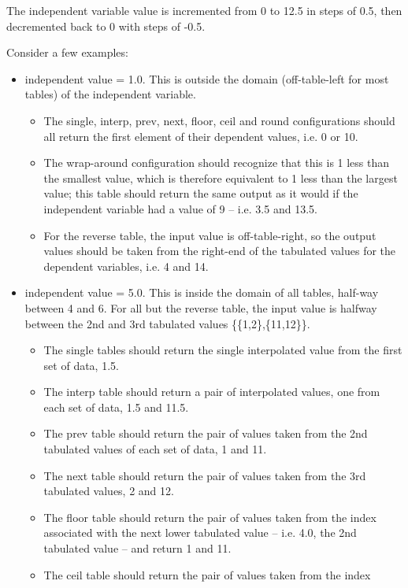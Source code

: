 \documentclass[11pt,fleqn]{report}
\begin{document}
The independent variable value is incremented from 0 to 12.5 in steps of 0.5,
then decremented back to 0 with steps of -0.5.

Consider a few examples:

\begin{itemize}
  \item independent value = 1.0.  This is outside the domain (off-table-left
  for most tables) of
  the independent variable.
  \begin{itemize}
    \item The single, interp, prev, next, floor, ceil and round
      configurations should all return the first element of their dependent
      values, i.e. 0 or 10.
    \item The wrap-around configuration should recognize
      that this is 1 less than the smallest value, which is therefore equivalent
      to 1 less
      than the largest value; this table should return the same output as it
      would if the independent variable had a value of 9 -- i.e. 3.5 and 13.5.
    \item For the reverse table, the input value is off-table-right,
      so the output values should be taken from the right-end of the
      tabulated values for the dependent variables, i.e. 4 and 14.
  \end{itemize}
  \item independent value = 5.0.  This is inside the domain of all tables,
  half-way between 4 and 6.  For all but the reverse table, the input value
  is halfway between the 2nd and 3rd tabulated values \{\{1,2\},\{11,12\}\}.
  \begin{itemize}
    \item The single tables should return the single interpolated value from
    the first set of data, 1.5.
    \item The interp table should return a pair of interpolated values, one
    from each set of data,
    1.5 and 11.5.
    \item The prev table should return the pair of values taken from the 2nd
    tabulated values of each set of data, 1 and 11.
    \item The next table should return the pair of values taken from the 3rd
    tabulated values, 2 and 12.
    \item The floor table should return the pair of values taken from the
    index associated with the next lower tabulated value -- i.e. 4.0, the 2nd
    tabulated value -- and return 1 and 11.
    \item The ceil table should return the pair of values taken from the index

\end{itemize}
\end{itemize}
\end{document}
